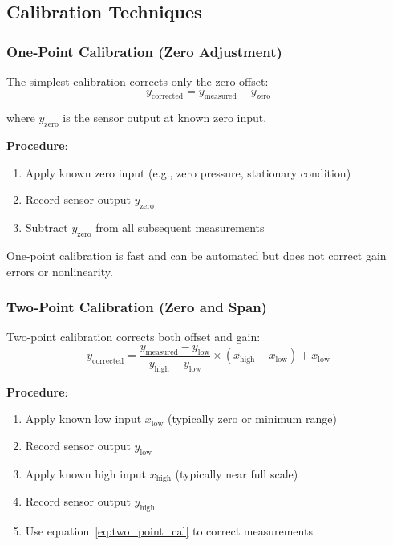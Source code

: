 \subsection{Calibration Techniques}

\subsubsection{One-Point Calibration (Zero Adjustment)}

The simplest calibration corrects only the zero offset:
\begin{equation}
y_{\text{corrected}} = y_{\text{measured}} - y_{\text{zero}}
\label{eq:one_point_cal}
\end{equation}

where $y_{\text{zero}}$ is the sensor output at known zero input.

\textbf{Procedure}:
\begin{enumerate}
    \item Apply known zero input (e.g., zero pressure, stationary condition)
    \item Record sensor output $y_{\text{zero}}$
    \item Subtract $y_{\text{zero}}$ from all subsequent measurements
\end{enumerate}

One-point calibration is fast and can be automated but does not correct gain errors or nonlinearity.

\subsubsection{Two-Point Calibration (Zero and Span)}

Two-point calibration corrects both offset and gain:
\begin{equation}
y_{\text{corrected}} = \frac{y_{\text{measured}} - y_{\text{low}}}{y_{\text{high}} - y_{\text{low}}} \times (x_{\text{high}} - x_{\text{low}}) + x_{\text{low}}
\label{eq:two_point_cal}
\end{equation}

\textbf{Procedure}:
\begin{enumerate}
    \item Apply known low input $x_{\text{low}}$ (typically zero or minimum range)
    \item Record sensor output $y_{\text{low}}$
    \item Apply known high input $x_{\text{high}}$ (typically near full scale)
    \item Record sensor output $y_{\text{high}}$
    \item Use equation~\eqref{eq:two_point_cal} to correct measurements
\end{enumerate}

